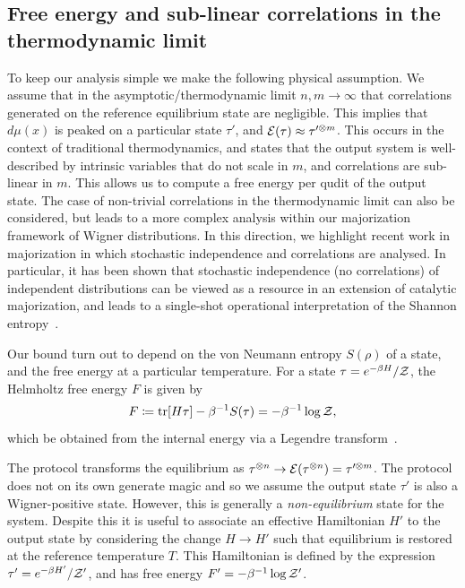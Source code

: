 \documentclass[pra,
aps,
twocolumn,
superscriptaddress,
groupedaddress,
nofootinbib,
reprint
]{revtex4-1}
\begin{document}
\subsection{Free energy and sub-linear correlations in the thermodynamic limit}
To keep our analysis simple we make the following physical assumption. We assume that in the asymptotic/thermodynamic limit $n,m \rightarrow \infty$ that correlations generated on the reference equilibrium state are negligible. This implies that $d\mu(x)$ is peaked on a particular state $\tau'$, and ${\mathcal E}(\tau) \approx \tau'^{\otimes m}$. This occurs in the context of traditional thermodynamics, and states that the output system is well-described by intrinsic variables that do not scale in $m$, and correlations are sub-linear in $m$. This allows us to compute a free energy per qudit of the output state. The case of non-trivial correlations in the thermodynamic limit can also be considered, but leads to a more complex analysis within our majorization framework of Wigner distributions. In this direction, we highlight recent work in majorization in which stochastic independence and correlations are analysed. In particular, it has been shown that stochastic independence (no correlations) of independent distributions can be viewed as a resource in an extension of catalytic majorization, and leads to a single-shot operational interpretation of the Shannon entropy~\cite{muller_2015, muller_2016, muller_2019}.

Our bound turn out to depend on the von Neumann entropy $S(\rho)$ of a state, and the free energy at a particular temperature.
For a state $\tau = e^{-\beta H}/\mathcal{Z}$, the Helmholtz free energy $F$ is given by
\begin{equation}
	F \coloneqq \mbox{tr}[H \tau] - \beta^{-1}S(\tau) = -\beta^{-1}\log{\mathcal{Z}},
\end{equation}
which be obtained from the internal energy via a Legendre transform~\cite{Pathria_1997}.

The protocol transforms the equilibrium as $\tau^{\otimes n} \rightarrow {\mathcal E}(\tau^{\otimes n}) = \tau^{\prime \otimes m}$.  The protocol does not on its own generate magic and so we assume the output state $\tau'$ is also a Wigner-positive state. However, this is generally a \emph{non-equilibrium} state for the system. Despite this it is useful to associate an effective Hamiltonian $H'$ to the output state by considering the change $H \rightarrow H'$ such that equilibrium is restored at the reference temperature $T$. This Hamiltonian is defined by the expression $\tau' = e^{-\beta H'}/\mathcal{Z}'$, and has free energy $F' = -\beta^{-1} \log \mathcal{Z}'$. 
\end{document}
